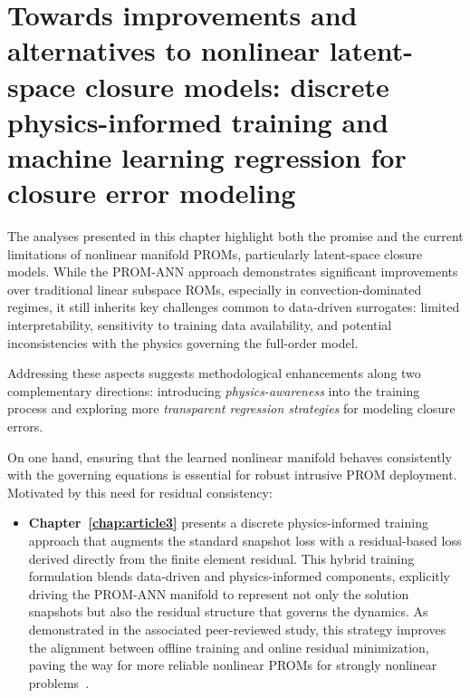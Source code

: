 \section{Towards improvements and alternatives to nonlinear latent-space closure models: discrete physics-informed training and machine learning regression for closure error modeling}
\label{sec:latent_closure_improvements}

The analyses presented in this chapter highlight both the promise and the current limitations of nonlinear manifold PROMs, particularly latent-space closure models. While the PROM-ANN approach demonstrates significant improvements over traditional linear subspace ROMs, especially in convection-dominated regimes, it still inherits key challenges common to data-driven surrogates: limited interpretability, sensitivity to training data availability, and potential inconsistencies with the physics governing the full-order model.

Addressing these aspects suggests methodological enhancements along two complementary directions: introducing \emph{physics-awareness} into the training process and exploring more \emph{transparent regression strategies} for modeling closure errors.

On one hand, ensuring that the learned nonlinear manifold behaves consistently with the governing equations is essential for robust intrusive PROM deployment. Motivated by this need for residual consistency:
\begin{itemize}
    \item \textbf{Chapter~\ref{chap:article3}} presents a discrete physics-informed training approach that augments the standard snapshot loss with a residual-based loss derived directly from the finite element residual. This hybrid training formulation blends data-driven and physics-informed components, explicitly driving the PROM-ANN manifold to represent not only the solution snapshots but also the residual structure that governs the dynamics. As demonstrated in the associated peer-reviewed study, this strategy improves the alignment between offline training and online residual minimization, paving the way for more reliable nonlinear PROMs for strongly nonlinear problems~\cite{sibuet2025discrete}.
\end{itemize}

